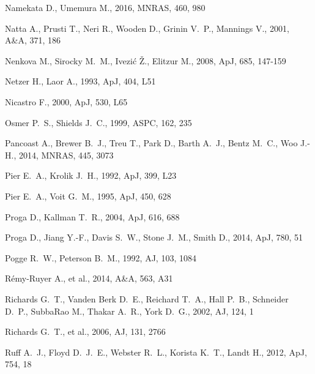 \documentclass[a4paper,fleqn,usenatbib]{mnras}
\begin{document}
\begin{thebibliography}{99}
 Namekata D., Umemura M., 2016, MNRAS, 460, 980

 Natta A., Prusti T., Neri R., Wooden D., Grinin V.~P., Mannings V., 2001, A\&A, 371, 186 

 Nenkova M., Sirocky M.~M., Ivezi{\'c} {\v Z}., Elitzur M., 2008, ApJ, 685, 147-159
 
 Netzer H., Laor A., 1993, ApJ, 404, L51 

 Nicastro F., 2000, ApJ, 530, L65 

 Osmer P.~S., Shields J.~C., 1999, ASPC, 162, 235 

 Pancoast A., Brewer B.~J., Treu T., Park D., Barth A.~J., Bentz M.~C., Woo J.-H., 2014, MNRAS, 445, 3073 

 Pier E.~A., Krolik J.~H., 1992, ApJ, 399, L23 

 Pier E.~A., Voit G.~M., 1995, ApJ, 450, 628 

 Proga D., Kallman T.~R., 2004, ApJ, 616, 688 

 Proga D., Jiang Y.-F., Davis S.~W., Stone J.~M., Smith D., 2014, ApJ, 780, 51
 
 Pogge R.~W., Peterson B.~M., 1992, AJ, 103, 1084 

 R{\'e}my-Ruyer A., et al., 2014, A\&A, 563, A31 

 Richards G.~T., Vanden Berk D.~E., Reichard T.~A., Hall P.~B., Schneider D.~P., SubbaRao M., Thakar A.~R., York D.~G., 2002, AJ, 124, 1 

 Richards G.~T., et al., 2006, AJ, 131, 2766

 Ruff A.~J., Floyd D.~J.~E., Webster R.~L., Korista K.~T., Landt H., 2012, ApJ, 754, 18 


\end{thebibliography}
\end{document}
